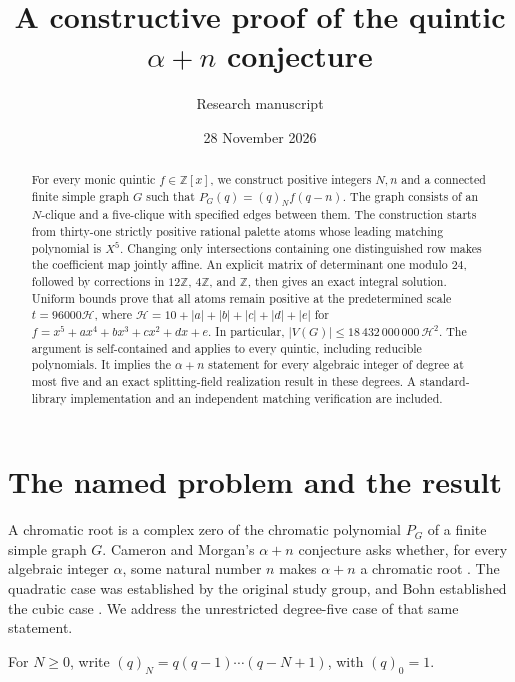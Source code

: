 \documentclass[11pt,a4paper]{article}
\title{\color{ink}\bfseries A constructive proof of the quintic\\
\texorpdfstring{\boldmath $\alpha+n$}{alpha+n} conjecture}
\author{\normalsize Research manuscript}
\date{28 November 2026}
\theoremstyle{definition}
\newcommand{\Z}{\mathbb Z}
\newcommand{\fall}[2]{(#1)_{#2}}
\newcommand{\htf}{\mathcal H}
\begin{document}
\maketitle
\begin{abstract}
For every monic quintic $f\in\Z[x]$, we construct positive integers $N,n$
and a connected finite simple graph $G$ such that
$P_G(q)=\fall qN f(q-n)$.
The graph consists of an $N$-clique and a five-clique with specified
edges between them. The construction starts from thirty-one strictly
positive rational palette atoms whose leading matching polynomial is $X^5$.
Changing only intersections containing one distinguished row makes the
coefficient map jointly affine. An explicit matrix of determinant one
modulo $24$, followed by corrections in $12\Z$, $4\Z$, and $\Z$,
then gives an exact integral solution. Uniform bounds prove that all atoms
remain positive at the predetermined scale
$t=96000\htf$, where
$\htf=10+|a|+|b|+|c|+|d|+|e|$ for
$f=x^5+ax^4+bx^3+cx^2+dx+e$.
In particular, $|V(G)|\le18\,432\,000\,000\,\htf^2$.
The argument is self-contained and applies to every quintic, including
reducible polynomials. It implies the $\alpha+n$ statement for every
algebraic integer of degree at most five and an exact splitting-field
realization result in these degrees. A standard-library implementation
and an independent matching verification are included.
\end{abstract}

\section{The named problem and the result}

A chromatic root is a complex zero of the chromatic polynomial $P_G$ of
a finite simple graph $G$. Cameron and Morgan's $\alpha+n$ conjecture asks
whether, for every algebraic integer $\alpha$, some natural number $n$
makes $\alpha+n$ a chromatic root \cite[Conjecture 4]{CM}.
The quadratic case was established by the original study group, and Bohn
established the cubic case \cite{CM,Bohn}. We address the unrestricted
degree-five case of that same statement.

For $N\ge0$, write $\fall qN=q(q-1)\cdots(q-N+1)$, with $\fall q0=1$.
\end{document}
